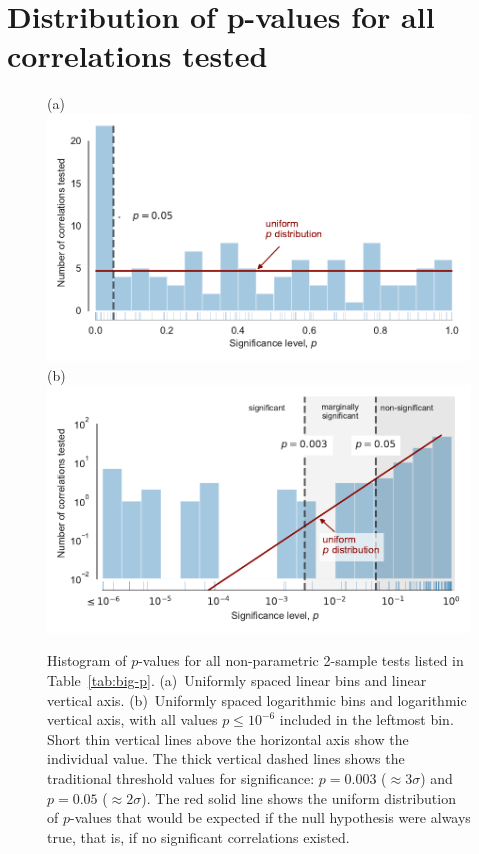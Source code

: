 
\section{Distribution of p-values for all correlations tested}
\label{sec:distr-p-values}

\begin{figure}
  (a)\\
  \includegraphics[width=\linewidth]{figs/p-value-histogram-new-linear}\\
  (b)\\
  \includegraphics[width=\linewidth]{figs/p-value-histogram-new}
  \caption{Histogram of \(p\)-values for all non-parametric 2-sample
    tests listed in Table~\ref{tab:big-p}. (a)~Uniformly spaced linear
    bins and linear vertical axis. (b)~Uniformly spaced logarithmic
    bins and logarithmic vertical axis, with all values
    \(p \le 10^{-6}\) included in the leftmost bin.  Short thin vertical
    lines above the horizontal axis show the individual value.  The
    thick vertical dashed lines shows the traditional threshold values
    for significance: \(p = 0.003\) (\(\approx 3 \sigma\)) and
    \(p = 0.05\) (\(\approx 2 \sigma\)). The red solid line shows the uniform
    distribution of \(p\)-values that would be expected if the null
    hypothesis were always true, that is, if no significant
    correlations existed.}
  \label{fig:histo-p-values}
\end{figure}


